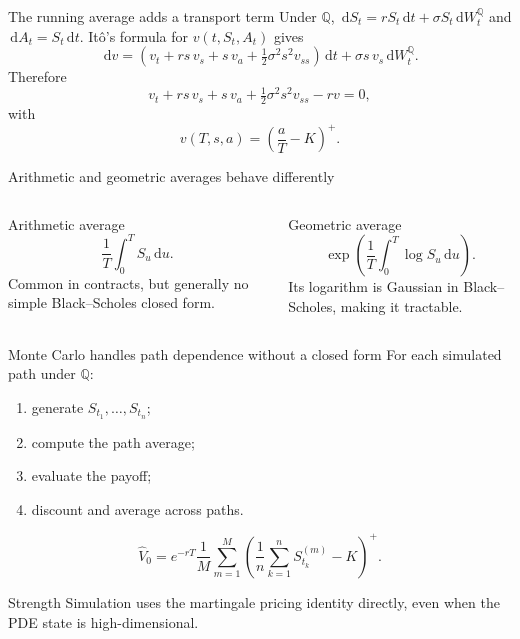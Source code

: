 \documentclass[handout,10pt,aspectratio=169]{beamer}
\newcommand{\dd}{\,\mathrm d}
\newcommand{\Q}{\mathbb Q}
\newcommand{\1}{\mathbf 1}
\begin{document}
\begin{frame}{The running average adds a transport term}
Under \(\Q\), \(\dd S_t=rS_t\dd t+\sigma S_t\dd W_t^\Q\) and
\(\dd A_t=S_t\dd t\). It\^o's formula for \(v(t,S_t,A_t)\) gives
\[
\dd v=
\left(v_t+rs\,v_s+s\,v_a+\tfrac12\sigma^2s^2v_{ss}\right)\dd t
+\sigma s\,v_s\dd W_t^\Q.
\]
Therefore
\[
\boxed{
v_t+rs\,v_s+s\,v_a
+\tfrac12\sigma^2s^2v_{ss}-rv=0,}
\]
with
\[
v(T,s,a)=\left(\frac aT-K\right)^+.
\]
\end{frame}

\begin{frame}{Arithmetic and geometric averages behave differently}
\begin{columns}[T,onlytextwidth]
\begin{block}{Arithmetic average}
\[
\frac1T\int_0^T S_u\dd u.
\]
Common in contracts, but generally no simple Black--Scholes closed form.
\end{block}
\begin{exampleblock}{Geometric average}
\[
\exp\!\left(\frac1T\int_0^T\log S_u\dd u\right).
\]
Its logarithm is Gaussian in Black--Scholes, making it tractable.
\end{exampleblock}
\end{columns}
\end{frame}


\begin{frame}{Monte Carlo handles path dependence without a closed form}
For each simulated path under \(\Q\):
\begin{enumerate}
  \item generate \(S_{t_1},\ldots,S_{t_n}\);
  \item compute the path average;
  \item evaluate the payoff;
  \item discount and average across paths.
\end{enumerate}
\[
\widehat V_0
=e^{-rT}\frac1M\sum_{m=1}^M
\left(\frac1n\sum_{k=1}^nS_{t_k}^{(m)}-K\right)^+.
\]
\begin{block}{Strength}
Simulation uses the martingale pricing identity directly, even when the PDE
state is high-dimensional.
\end{block}
\end{frame}
\end{document}
